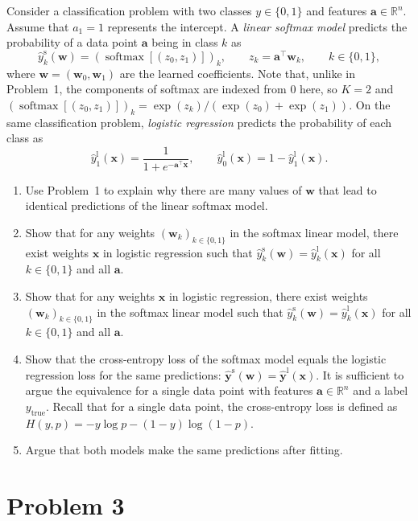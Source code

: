 \documentclass[letterpaper]{article}
\newcommand{\Real}{\mathbb{R}}
\newcommand{\tr}{^\top}
\DeclareMathOperator{\softmax}{softmax}
\begin{document}
Consider a classification problem with two classes $y \in \{0, 1\}$ and features $\bm{a} \in \Real^n$. Assume that $a_1 = 1$ represents the intercept. A \emph{linear softmax model} predicts the probability of a data point $\bm{a}$ being in class $k$ as
\[
  \hat{y}_k^{\mathrm{s}}(\bm{w}) = (\softmax[(z_0, z_1)])_k, \qquad z_k = \bm{a}\tr \bm{w}_k, \qquad k \in \{0, 1\},
\]
where $\bm{w} = (\bm{w}_0, \bm{w}_1)$ are the learned coefficients. Note that, unlike in Problem~1, the components of softmax are indexed from $0$ here, so $K = 2$ and $(\softmax[(z_0, z_1)])_k = \exp(z_k) / (\exp(z_0) + \exp(z_1))$. On the same classification problem, \emph{logistic regression} predicts the probability of each class as
\[
  \hat{y}_1^{\mathrm{l}}(\bm{x}) = \frac{1}{1 + e^{-\bm{a}\tr \bm{x}}}, \qquad \hat{y}_0^{\mathrm{l}}(\bm{x}) = 1 - \hat{y}_1^{\mathrm{l}}(\bm{x}).
\]
\begin{enumerate}
\item Use Problem~1 to explain why there are many values of $\bm{w}$ that lead to identical predictions of the linear softmax model. 
\item Show that for any weights $(\bm{w}_k)_{k\in \{ 0,1 \}}$ in the softmax linear model, there exist weights $\bm{x}$ in logistic regression such that $\hat{y}_k^{\mathrm{s}}(\bm{w}) = \hat{y}_k^{\mathrm{l}}(\bm{x})$ for all $k \in \{0, 1\}$ and all $\bm{a}$.
\item Show that for any weights $\bm{x}$ in logistic regression, there exist weights $(\bm{w}_k)_{k\in \{ 0,1 \}}$ in the softmax linear model such that $\hat{y}_k^{\mathrm{s}}(\bm{w}) = \hat{y}_k^{\mathrm{l}}(\bm{x})$ for all $k \in \{0, 1\}$ and all $\bm{a}$.
\item Show that the cross-entropy loss of the softmax model equals the logistic regression loss for the same predictions: $\bm{\hat{y}}^{\mathrm{s}}(\bm{w}) = \bm{\hat{y}}^{\mathrm{l}}(\bm{x})$. It is sufficient to argue the equivalence for a single data point with features $\bm{a} \in \Real^n$ and a label $y_\text{true}$. Recall that for a single data point, the cross-entropy loss is defined as $H(y, p) = - y \log p - (1 - y) \log (1 - p)$.
\item Argue that both models make the same predictions after fitting. 
\end{enumerate}

\section*{Problem 3}
\end{document}

